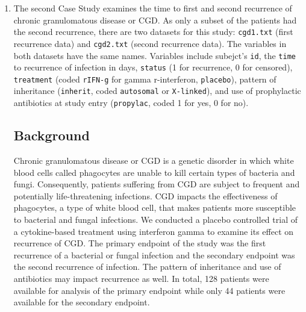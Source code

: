 \documentclass{article}
\begin{document}
\begin{enumerate}
		\item The second Case Study examines the time to first and second recurrence of chronic granulomatous disease or CGD. As only a subset of the patients had the second recurrence, there are two datasets for this study: \texttt{cgd1.txt} (first recurrence data) and \texttt{cgd2.txt} (second recurrence data). The variables in both datasets have the same names. Variables include subejct's \texttt{id}, the \texttt{time} to recurrence of infection in days, \texttt{status} (1 for recurrence, 0 for censored), \texttt{treatment} (coded \texttt{rIFN-g} for gamma r-interferon, \texttt{placebo}), pattern of inheritance (\texttt{inherit}, coded \texttt{autosomal} or \texttt{X-linked}), and use of prophylactic antibiotics at study entry (\texttt{propylac}, coded 1 for yes, 0 for no).

	\subsection*{Background}

	Chronic granulomatous disease or CGD is a genetic disorder in which white blood cells called phagocytes are unable to kill certain types of bacteria and fungi. Consequently, patients suffering from CGD are subject to frequent and potentially life-threatening infections. CGD impacts the effectiveness of phagocytes, a type of white blood cell, that makes patients more susceptible to bacterial and fungal infections. We conducted a placebo controlled trial of a cytokine-based treatment using interferon gamma to examine its effect on recurrence of CGD. The primary endpoint of the study was the first recurrence of a bacterial or fungal infection and the secondary endpoint was the second recurrence of infection. The pattern of inheritance and use of antibiotics may impact recurrence as well. In total, 128 patients were available for analysis of the primary endpoint while only 44 patients were available for the secondary endpoint.

		
	
	\end{enumerate}
		
\end{document}
